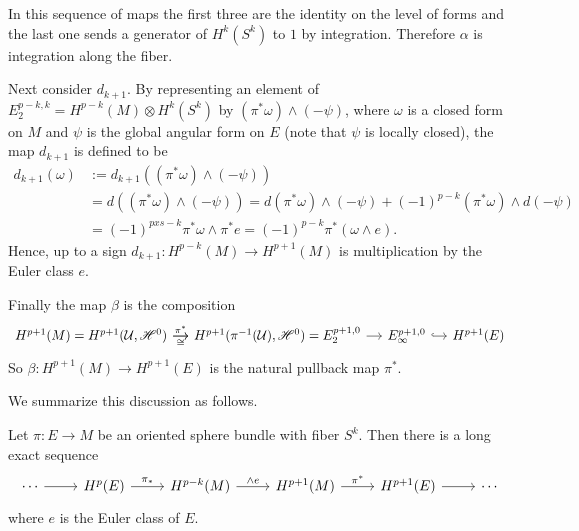 In this sequence of maps the first three are the identity on the level of forms and the last one sends a generator of $H^k(S^k)$ to $1$ by integration. Therefore $\alpha$ 
is integration along the fiber.\par
Next consider $d_{k+1}$. By representing an element of $E_2^{p-k,k}=H^{p-k}(M)\otimes H^k(S^k)$ by $(\pi^*\omega)\wedge(-\psi)$, where $\omega$ is a closed form on $M$ 
and $\psi$ is the global angular form on $E$ (note that $\psi$ is locally closed), the map $d_{k+1}$ is defined to be
\begin{align*}
d_{k+1}(\omega)&:=d_{k+1}((\pi^*\omega)\wedge(-\psi))\\
&=d((\pi^*\omega)\wedge(-\psi))=d(\pi^*\omega)\wedge(-\psi)+(-1)^{p-k}(\pi^*\omega)\wedge d(-\psi)\\
&=(-1)^{pxs-k}\pi^*\omega\wedge\pi^* e=(-1)^{p-k}\pi^*(\omega\wedge e).
\end{align*}
Hence, up to a sign $d_{k+1}:H^{p-k}(M)\to H^{p+1}(M)$ is multiplication by the Euler class $e$.\par
Finally the map $\beta$ is the composition
\[\begin{tikzcd}[column sep=1.2em]
H^{p+1}(M)=H^{p+1}(\mathcal{U},\mathscr{H}^0)\ar[r,"\pi^*"]\ar[r,swap,"\cong"]&H^{p+1}(\pi^{-1}(\mathcal{U}),\mathscr{H}^0)=E_2^{p+1,0}\ar[r]&E_{\infty}^{p+1,0}\ar[r,hook]&H^{p+1}(E)
\end{tikzcd}\]
So $\beta:H^{p+1}(M)\to H^{p+1}(E)$ is the natural pullback map $\pi^*$.\par
We summarize this discussion as follows.
\begin{theorem}
Let $\pi:E\to M$ be an oriented sphere bundle with fiber $S^k$. Then there is a long exact sequence
\[\begin{tikzcd}
\cdots\ar[r]&H^p(E)\ar[r,"\pi_*"]&H^{p-k}(M)\ar[r,"\wedge e"]&H^{p+1}(M)\ar[r,"\pi^*"]&H^{p+1}(E)\ar[r]&\cdots
\end{tikzcd}\]
where $e$ is the Euler class of $E$.
\end{theorem}
